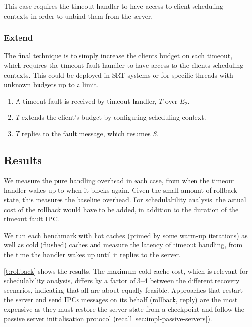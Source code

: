This case requires the timeout handler to have access to client scheduling contexts in order to
unbind them from the server. 

\subsubsection{Extend}

The final technique is to simply increase the clients budget on each timeout, which requires the
timeout fault handler to have access to the clients scheduling contexts.
This could be deployed in \gls{SRT} systems or for specific threads with unknown budgets up to a limit. 

\begin{enumerate}\label{e:extend}
    \item A timeout fault is received by timeout handler, $T$ over $E_{2}$.
    \item $T$ extends the client's budget by configuring scheduling context.
    \item $T$ replies to the fault message, which resumes $S$.
\end{enumerate}

\subsection{Results}

We measure the pure handling overhead in each case, from when the timeout handler wakes up to when
it blocks again.  Given the small amount of rollback state, this measures the baseline overhead. For
schedulability analysis, the actual cost of the rollback would have to be added, in addition to the
duration of the timeout fault IPC. 
 
We run each benchmark with hot caches (primed by some warm-up
iterations)  as well as cold (flushed) caches and measure the 
latency of timeout handling, from the time the handler wakes up
until it replies to the server.

\autoref{t:rollback} shows the results. The maximum
cold-cache cost, which is relevant for schedulability analysis, differs by a factor of 3--4 between
the different recovery scenarios, indicating that all are about equally feasible.  Approaches that
restart the server and send \glspl{IPC} messages on its behalf (rollback, reply) are the most
expensive as they must restore the server state from a checkpoint and follow the passive server
initialisation protocol (recall \cref{sec:impl-passive-servers}). 

